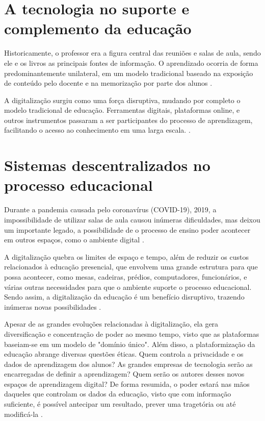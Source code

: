 \section{A tecnologia no suporte e complemento da educação}
Historicamente, o professor era a figura central das reuniões e salas de aula, sendo ele e os livros as principais fontes de informação. O aprendizado ocorria de forma predominantemente unilateral, em um modelo tradicional baseado na exposição de conteúdo pelo docente e na memorização por parte dos alunos \cite{unicep2024}.

A digitalização surgiu como uma força disruptiva, mudando por completo o modelo tradicional de educação. Ferramentas digitais, plataformas online, e outros instrumentos passaram a ser participantes do processo de aprendizagem, facilitando o acesso ao conhecimento em uma larga escala. \cite{unicep2024}.

\section{Sistemas descentralizados no processo educacional}
Durante a pandemia causada pelo coronavírus (COVID-19), 2019, a impossibilidade de utilizar salas de aula causou inúmeras dificuldades, mas deixou um importante legado, a possibilidade de o processo de ensino poder acontecer em outros espaços, como o ambiente digital \cite{valente2022}.

A digitalização quebra os limites de espaço e tempo, além de reduzir os custos relacionados à educação presencial, que envolvem uma grande estrutura para que possa acontecer, como mesas, cadeiras, prédios, computadores, funcionários, e várias outras necessidades para que o ambiente suporte o processo educacional. Sendo assim, a digitalização da educação é um benefício disruptivo, trazendo inúmeras novas possibilidades \cite{valente2022}.

Apesar de as grandes evoluções relacionadas à digitalização, ela gera diversificação e concentração de poder ao mesmo tempo, visto que as plataformas baseiam-se em um modelo de "domínio único". Além disso, a plataformização da educação abrange diversas questões éticas. Quem controla a privacidade e os dados de aprendizagem dos alunos? As grandes empresas de tecnologia serão as encarregadas de definir a aprendizagem? Quem serão os autores desses novos espaços de aprendizagem digital? De forma resumida, o poder estará nas mãos daqueles que controlam os dados da educação, visto que com informação suficiente, é possível antecipar um resultado, prever uma tragetória ou até modificá-la \cite{valente2022}.


